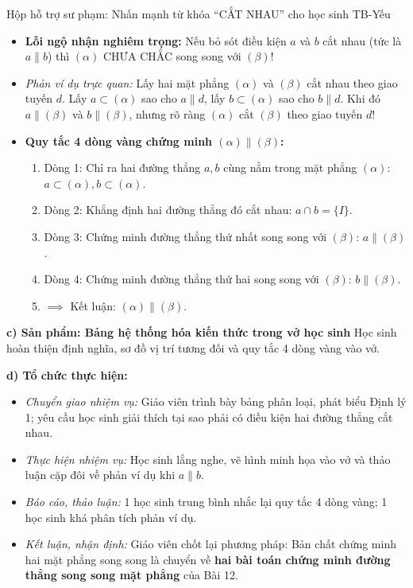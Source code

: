 \documentclass[12pt, a4paper]{article}
\begin{document}
\begin{scaffoldbox}{Hộp hỗ trợ sư phạm: Nhấn mạnh từ khóa ``CẮT NHAU'' cho học sinh TB-Yếu}
\begin{itemize}[leftmargin=0.6cm]
    \item \textbf{Lỗi ngộ nhận nghiêm trọng:} Nếu bỏ sót điều kiện $a$ và $b$ cắt nhau (tức là $a \parallel b$) thì $(\alpha)$ CHƯA CHẮC song song với $(\beta)$!
    \item \textit{Phản ví dụ trực quan:} Lấy hai mặt phẳng $(\alpha)$ và $(\beta)$ cắt nhau theo giao tuyến $d$. Lấy $a \subset (\alpha)$ sao cho $a \parallel d$, lấy $b \subset (\alpha)$ sao cho $b \parallel d$. Khi đó $a \parallel (\beta)$ và $b \parallel (\beta)$, nhưng rõ ràng $(\alpha)$ cắt $(\beta)$ theo giao tuyến $d$!
    \item \textbf{Quy tắc 4 dòng vàng chứng minh $(\alpha) \parallel (\beta)$:}
    \begin{enumerate}
        \item Dòng 1: Chỉ ra hai đường thẳng $a, b$ cùng nằm trong mặt phẳng $(\alpha)$: $a \subset (\alpha), b \subset (\alpha)$.
        \item Dòng 2: Khẳng định hai đường thẳng đó cắt nhau: $a \cap b = \{I\}$.
        \item Dòng 3: Chứng minh đường thẳng thứ nhất song song với $(\beta)$: $a \parallel (\beta)$.
        \item Dòng 4: Chứng minh đường thẳng thứ hai song song với $(\beta)$: $b \parallel (\beta)$.
        \item $\implies$ Kết luận: $(\alpha) \parallel (\beta)$.
    \end{enumerate}
\end{itemize}
\end{scaffoldbox}

\noindent \textbf{c) Sản phẩm: Bảng hệ thống hóa kiến thức trong vở học sinh}
Học sinh hoàn thiện định nghĩa, sơ đồ vị trí tương đối và quy tắc 4 dòng vàng vào vở.

\noindent \textbf{d) Tổ chức thực hiện:}
\begin{itemize}[leftmargin=0.8cm]
    \item \textit{Chuyển giao nhiệm vụ:} Giáo viên trình bày bảng phân loại, phát biểu Định lý 1; yêu cầu học sinh giải thích tại sao phải có điều kiện hai đường thẳng cắt nhau.
    \item \textit{Thực hiện nhiệm vụ:} Học sinh lắng nghe, vẽ hình minh họa vào vở và thảo luận cặp đôi về phản ví dụ khi $a \parallel b$.
    \item \textit{Báo cáo, thảo luận:} 1 học sinh trung bình nhắc lại quy tắc 4 dòng vàng; 1 học sinh khá phân tích phản ví dụ.
    \item \textit{Kết luận, nhận định:} Giáo viên chốt lại phương pháp: Bản chất chứng minh hai mặt phẳng song song là chuyển về \textbf{hai bài toán chứng minh đường thẳng song song mặt phẳng} của Bài 12.
\end{itemize}
\end{document}
